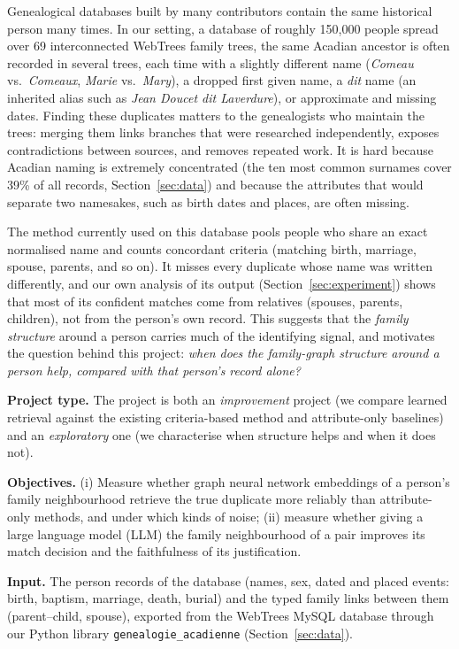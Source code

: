 Genealogical databases built by many contributors contain the same historical person many times.
In our setting, a database of roughly 150{,}000 people spread over 69 interconnected WebTrees family trees, the same Acadian ancestor is often recorded in several trees, each time with a slightly different name (\textit{Comeau} vs.\ \textit{Comeaux}, \textit{Marie} vs.\ \textit{Mary}), a dropped first given name, a \textit{dit} name (an inherited alias such as \textit{Jean Doucet dit Laverdure}), or approximate and missing dates.
Finding these duplicates matters to the genealogists who maintain the trees: merging them links branches that were researched independently, exposes contradictions between sources, and removes repeated work.
It is hard because Acadian naming is extremely concentrated (the ten most common surnames cover 39\% of all records, Section~\ref{sec:data}) and because the attributes that would separate two namesakes, such as birth dates and places, are often missing.

The method currently used on this database pools people who share an exact normalised name and counts concordant criteria (matching birth, marriage, spouse, parents, and so on).
It misses every duplicate whose name was written differently, and our own analysis of its output (Section~\ref{sec:experiment}) shows that most of its confident matches come from relatives (spouses, parents, children), not from the person's own record.
This suggests that the \emph{family structure} around a person carries much of the identifying signal, and motivates the question behind this project:
\emph{when does the family-graph structure around a person help, compared with that person's record alone?}

\textbf{Project type.} The project is both an \emph{improvement} project (we compare learned retrieval against the existing criteria-based method and attribute-only baselines) and an \emph{exploratory} one (we characterise when structure helps and when it does not).

\textbf{Objectives.} (i) Measure whether graph neural network embeddings of a person's family neighbourhood retrieve the true duplicate more reliably than attribute-only methods, and under which kinds of noise; (ii) measure whether giving a large language model (LLM) the family neighbourhood of a pair improves its match decision and the faithfulness of its justification.

\textbf{Input.} The person records of the database (names, sex, dated and placed events: birth, baptism, marriage, death, burial) and the typed family links between them (parent--child, spouse), exported from the WebTrees MySQL database through our Python library \texttt{genealogie\_acadienne} (Section~\ref{sec:data}).

